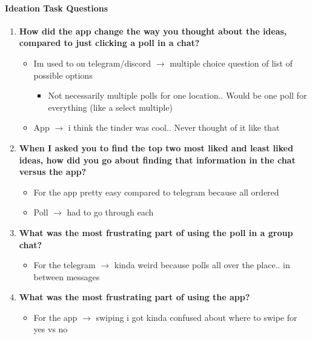 \documentclass[12pt,a4paper]{article}
\begin{document}
\paragraph{Ideation Task Questions}

\begin{enumerate}
    \item \textbf{How did the app change the way you thought about the ideas, compared to just clicking a poll in a chat?}
    
    \begin{itemize}
        \item Im used to on telegram/discord $\rightarrow$ multiple choice question of list of possible options
        \begin{itemize}
            \item Not necessarily multiple polls for one location.. Would be one poll for everything (like a select multiple)
        \end{itemize}
        \item App $\rightarrow$ i think the tinder was cool.. Never thought of it like that
    \end{itemize}
    
    \item \textbf{When I asked you to find the top two most liked and least liked ideas, how did you go about finding that information in the chat versus the app?}
    
    \begin{itemize}
        \item For the app pretty easy compared to telegram because all ordered
        \item Poll $\rightarrow$ had to go through each
    \end{itemize}
    
    \item \textbf{What was the most frustrating part of using the poll in a group chat?}
    
    \begin{itemize}
        \item For the telegram $\rightarrow$ kinda weird because polls all over the place.. in between messages
    \end{itemize}
    
    \item \textbf{What was the most frustrating part of using the app?}
    
    \begin{itemize}
        \item For the app $\rightarrow$ swiping i got kinda confused about where to swipe for yes vs no
    \end{itemize}
    

\end{enumerate}
\end{document}
